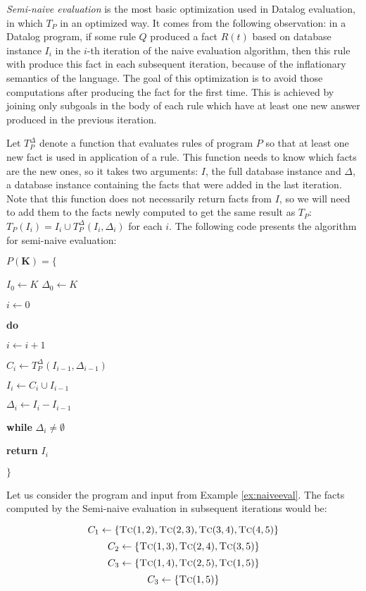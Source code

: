 \emph{Semi-naive evaluation} is the most basic optimization used in Datalog evaluation, in which $T_P$ in an optimized way. It comes from the following observation: in a Datalog program, if some rule $Q$ produced a fact $R(t)$ based on database instance $I_i$ in the $i$-th iteration of the naive evaluation algorithm, then this rule with produce this fact in each subsequent iteration, because of the inflationary semantics of the language. The goal of this optimization is to avoid those computations after producing the fact for the first time. This is achieved by joining only subgoals in the body of each rule which have at least one new answer produced in the previous iteration. 

Let $T^\Delta_P$ denote a function that evaluates rules of program $P$ so that at least one new fact is used in application of a rule. This function needs to know which facts are the new ones, so it takes two arguments: $I$, the full database instance and $\Delta$, a database instance containing the facts that were added in the last iteration. Note that this function does not necessarily return facts from $I$, so we will need to add them to the facts newly computed to get the same result as $T_P$: $T_P(I_i) = I_i \cup T_P^\Delta(I_i, \Delta_i)$ for each $i$. The following code presents the algorithm for semi-naive evaluation: 


\parbox{0.5\textwidth}{
$P(\textbf{K}) = \{$

{\addtolength{\leftskip}{5mm}

$I_0 \leftarrow K$
$\Delta_0 \leftarrow K$

$i \leftarrow 0$

\textbf{do}

{\addtolength{\leftskip}{5mm}

$i \leftarrow i + 1$

$C_i \leftarrow T_P^\Delta(I_{i-1}, \Delta_{i-1})$

$I_i \leftarrow C_i \cup I_{i-1}$

$\Delta_i \leftarrow I_i - I_{i-1}$

}

\textbf{while} $\Delta_i \ne \emptyset$

\textbf{return} $I_i$

}

$\}$
}



\begin{exmp}
Let us consider the program and input from Example \ref{ex:naiveeval}. The facts computed by the Semi-naive evaluation in subsequent iterations would be:

$$C_1 \leftarrow \{\textsc{Tc}(1, 2), \textsc{Tc}(2, 3), \textsc{Tc}(3, 4), \textsc{Tc}(4, 5)\}$$
$$C_2 \leftarrow \{\textsc{Tc}(1, 3), \textsc{Tc}(2, 4), \textsc{Tc}(3, 5)\}$$
$$C_3 \leftarrow \{\textsc{Tc}(1, 4), \textsc{Tc}(2, 5), \textsc{Tc}(1, 5)\}$$
$$C_3 \leftarrow \{\textsc{Tc}(1, 5)\}$$
\end{exmp}\label{ex:semieval}

